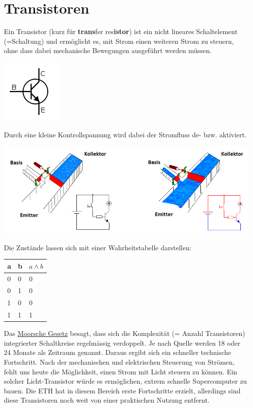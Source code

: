 \documentclass[a4paper,10pt]{report}
\begin{document}
\section{Transistoren}
Ein Transistor (kurz für \textbf{trans}fer res\textbf{istor}) ist ein nicht lineares Schaltelement (=Schaltung) und ermöglicht es, mit Strom einen weiteren Strom zu steuern, ohne dass dabei mechanische Bewegungen ausgeführt werden müssen.
\begin{center}
\includegraphics[scale=0.6]{imgs/Transistor.png}
\end{center}
Durch eine kleine Kontrollspannung wird dabei der Stromfluss de- bzw. aktiviert.
\begin{center}
\includegraphics[scale=0.75]{imgs/TransistorFluss.png}
\end{center}
Die Zustände lassen sich mit einer Wahrheitstabelle darstellen:
\begin{center}\begin{tabular}{l|l|l}
a	&	b	& $a \land b$\\ \hline
0	&	0	&	0 \\ \hline
0	&	1	&	0 \\ \hline
1	&	0	&	0 \\ \hline
1	&	1	&	1 \\
\end{tabular}\end{center}
Das \underline{Moorsche Gesetz} besagt, dass sich die Komplexität (= Anzahl Transistoren) integrierter Schaltkreise regelmässig verdoppelt. Je nach Quelle werden 18 oder 24 Monate als Zeitraum genannt. Daraus ergibt sich ein schneller technische Fortschritt. Nach der mechanischen und elektrischen Steuerung von Strömen, fehlt uns heute die Möglichkeit, einen Strom mit Licht steuern zu können. Ein solcher Licht-Transistor würde es ermöglichen, extrem schnelle Supercomputer zu bauen. Die ETH hat in diesem Bereich erste Fortschritte erzielt, allerdings sind diese Transistoren noch weit von einer praktischen Nutzung entfernt.
\end{document}
